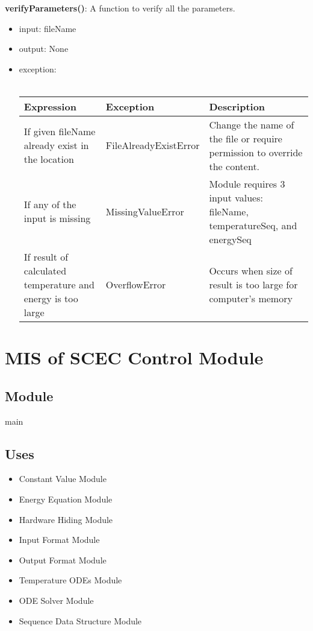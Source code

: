 \documentclass[12pt, titlepage]{article}
\begin{document}
\textbf{verifyParameters()}: A function to verify all the parameters. 
\begin{itemize}
    \item input: fileName
    \item output: None
    \item exception: \\ \\
     \begin{tabular}{p{5.5cm} p{4cm} p{4.6cm}}
    \hline
 \textbf{Expression} & \textbf{Exception} & \textbf{Description} \\
  \hline
    If given fileName already exist in the location & FileAlreadyExistError & Change the name of the file or require permission to override the content. \\
    \hline
    If any of the input is missing  & MissingValueError & Module requires 3 input values: fileName, temperatureSeq, and energySeq \\
    \hline 
    If result of calculated temperature and energy is too large & OverflowError & Occurs when size of result is too large for computer's memory   \\
    \hline
 \end{tabular}
\end{itemize}


\section{MIS of SCEC Control Module} \label{SCEC_Control_Module} 

\subsection{Module}

main 

\subsection{Uses}

\begin{itemize}
    \item Constant Value Module
    \item Energy Equation Module
    \item Hardware Hiding Module
    \item Input Format Module 
    \item Output Format Module 
    \item Temperature ODEs Module
    \item ODE Solver Module
    \item Sequence Data Structure Module
\end{itemize}
\end{document}
